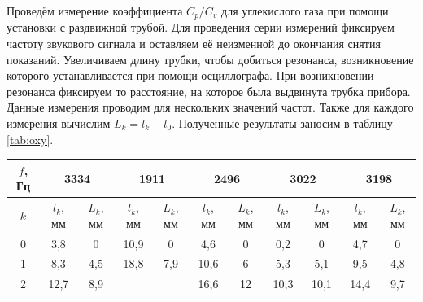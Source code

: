 \documentclass[12pt,a4paper]{article}
\begin{document}
\label{ident}

Проведём измерение коэффициента $ C_p/C_v $ для углекислого газа при помощи установки с раздвижной трубой. Для проведения серии измерений фиксируем частоту звукового сигнала и оставляем её неизменной до окончания снятия показаний. Увеличиваем длину трубки, чтобы добиться резонанса, возникновение которого устанавливается при помощи осциллографа.
\newpage
При возникновении резонанса фиксируем то расстояние, на которое была выдвинута трубка прибора. Данные измерения проводим для нескольких значений частот.  Также для каждого измерения вычислим $ L_k = l_k - l_0 $. Полученные результаты заносим в таблицу \ref{tab:oxy}.

\begin{table}[!h]
\centering
\begin{tabular}{|c|cc|cc|cc|cc|cc|}
\hline
\multicolumn{1}{|c|}{$f$, Гц} & \multicolumn{2}{c|}{3334}                          & \multicolumn{2}{c|}{1911}                               & \multicolumn{2}{c|}{2496}                               & \multicolumn{2}{c|}{3022}                               & \multicolumn{2}{c|}{3198}                               \\ \hline
$k$                           & \multicolumn{1}{c|}{$l_k$, мм} & $L_k$, мм                 & \multicolumn{1}{c|}{$l_k$, мм} & \multicolumn{1}{c|}{$L_k$, мм} & \multicolumn{1}{c|}{$l_k$, мм} & \multicolumn{1}{c|}{$L_k$, мм} & \multicolumn{1}{c|}{$l_k$, мм} & \multicolumn{1}{c|}{$L_k$, мм} &  \multicolumn{1}{c|}{$l_k$, мм} & \multicolumn{1}{c|}{$L_k$, мм} \\ \hline
 0                          & \multicolumn{1}{c|}{3,8}   & 0                      & \multicolumn{1}{c|}{10,9}  & \multicolumn{1}{c|}{0}     & \multicolumn{1}{c|}{4,6}   &     0                      & \multicolumn{1}{c|}{0,2}   &    0                       & \multicolumn{1}{c|}{4,7}   &               0            \\ \hline
1                           & \multicolumn{1}{c|}{8,3}   & 4,5                   & \multicolumn{1}{c|}{18,8}  & \multicolumn{1}{c|}{7,9}   & \multicolumn{1}{c|}{10,6}  & 6                          & \multicolumn{1}{c|}{5,3}   & 5,1                        & \multicolumn{1}{c|}{9,5}   & 4,8                        \\ \hline
2                           & \multicolumn{1}{c|}{12,7}  & 8,9                   & \multicolumn{1}{c|}{}      &                            & \multicolumn{1}{c|}{16,6}  & 12                         & \multicolumn{1}{c|}{10,3}  & 10,1                       & \multicolumn{1}{c|}{14,4}  & 9,7                        \\ \hline

\end{tabular}
\end{table}
\end{document}
